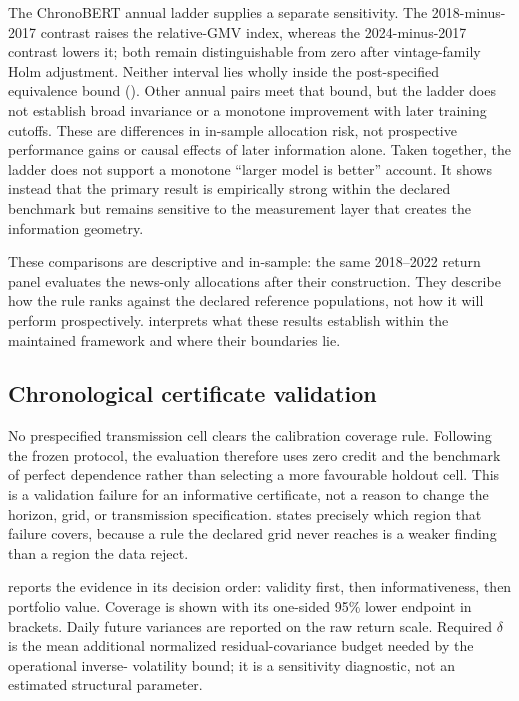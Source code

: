 The ChronoBERT annual ladder supplies a separate sensitivity.
The 2018-minus-2017 contrast raises the relative-GMV index, whereas the
2024-minus-2017 contrast lowers it; both remain distinguishable from zero
after vintage-family Holm adjustment.
Neither interval lies wholly inside the post-specified equivalence bound
().
Other annual pairs meet that bound, but the ladder does not establish
broad invariance or a monotone improvement with later training cutoffs.
These are differences in in-sample allocation risk, not prospective
performance gains or causal effects of later information alone.
Taken together, the ladder does not support a monotone ``larger model is
better'' account.
It shows instead that the primary result is empirically strong within the
declared benchmark but remains sensitive to the measurement layer that creates
the information geometry.

These comparisons are descriptive and in-sample: the same 2018--2022 return
panel evaluates the news-only allocations after their construction.
They describe how the rule ranks against the declared reference populations,
not how it will perform prospectively.
 interprets what these results establish within the
maintained framework and where their boundaries lie.
\iffalse
\subsection{Chronological certificate validation}
\label{sec:chronological-validation}

No prespecified transmission cell clears the calibration coverage rule.
Following the frozen protocol, the evaluation therefore uses zero credit and
the benchmark of perfect dependence rather than selecting a more favourable
holdout cell.  This is a validation failure for an informative certificate,
not a reason to change the horizon, grid, or transmission specification.
 states precisely which region that failure
covers, because a rule the declared grid never reaches is a weaker finding than
a region the data reject.

 reports the evidence in its decision order:
validity first, then informativeness, then portfolio value.  Coverage is shown
with its one-sided 95\% lower endpoint in brackets.  Daily future variances are
reported on the raw return scale.  Required $\delta$ is the mean additional
normalized residual-covariance budget needed by the operational inverse-
volatility bound; it is a sensitivity diagnostic, not an estimated structural
parameter.

